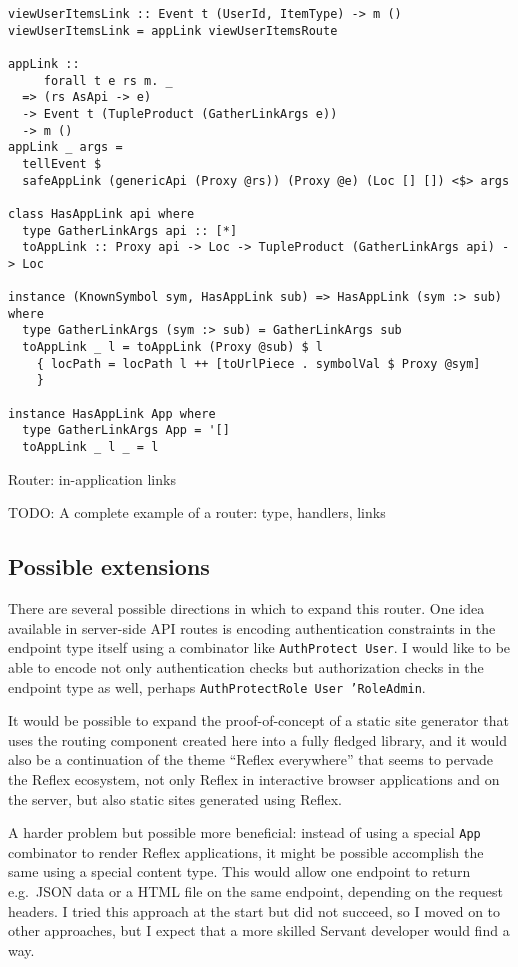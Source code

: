 \documentclass[english,odsaz]{fitthesis}
\begin{document}
\begin{listing}[htbp]
\begin{verbatim}
viewUserItemsLink :: Event t (UserId, ItemType) -> m ()
viewUserItemsLink = appLink viewUserItemsRoute

appLink ::
     forall t e rs m. _
  => (rs AsApi -> e)
  -> Event t (TupleProduct (GatherLinkArgs e))
  -> m ()
appLink _ args =
  tellEvent $
  safeAppLink (genericApi (Proxy @rs)) (Proxy @e) (Loc [] []) <$> args

class HasAppLink api where
  type GatherLinkArgs api :: [*]
  toAppLink :: Proxy api -> Loc -> TupleProduct (GatherLinkArgs api) -> Loc

instance (KnownSymbol sym, HasAppLink sub) => HasAppLink (sym :> sub) where
  type GatherLinkArgs (sym :> sub) = GatherLinkArgs sub
  toAppLink _ l = toAppLink (Proxy @sub) $ l
    { locPath = locPath l ++ [toUrlPiece . symbolVal $ Proxy @sym]
    }

instance HasAppLink App where
  type GatherLinkArgs App = '[]
  toAppLink _ l _ = l
\end{verbatim}
\caption{Router: in-application links \label{router-link}}
\end{listing}

TODO: A complete example of a router: type, handlers, links

\subsection{Possible extensions}
\label{sec:org951d223}
There are several possible directions in which to expand this router. One idea
available in server-side API routes is encoding authentication constraints in
the endpoint type itself using a combinator like \texttt{AuthProtect User}. I would like
to be able to encode not only authentication checks but authorization checks in
the endpoint type as well, perhaps \texttt{AuthProtectRole User 'RoleAdmin}.

It would be possible to expand the proof-of-concept of a static site generator
that uses the routing component created here into a fully fledged library, and
it would also be a continuation of the theme ``Reflex everywhere'' that seems to
pervade the Reflex ecosystem, not only Reflex in interactive browser
applications and on the server, but also static sites generated using Reflex.

A harder problem but possible more beneficial: instead of using a special \texttt{App}
combinator to render Reflex applications, it might be possible accomplish the
same using a special content type. This would allow one endpoint to return
e.g.~JSON data or a HTML file on the same endpoint, depending on the request
headers. I tried this approach at the start but did not succeed, so I moved on
to other approaches, but I expect that a more skilled Servant developer would
find a way.
\end{document}
